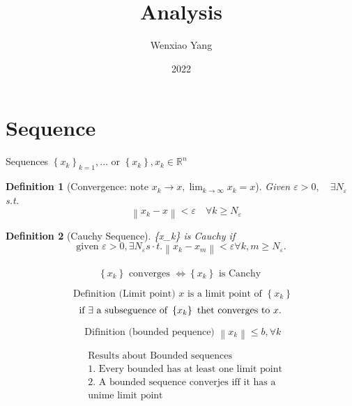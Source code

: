 \documentclass[11pt,a4paper]{article}
\title{Analysis}
\author[*]{Wenxiao Yang}
\affil[*]{Department of Mathematics, University of Illinois at Urbana-Champaign}
\date{2022}
\newtheorem{definition}{Definition}
\begin{document}
\maketitle
\tableofcontents
\newpage

\section{Sequence}
Sequences $\left\{x_{k}\right\}_{k=1}, \ldots$ or $\left\{x_{k}\right\}, x_{k} \in \mathbb{R}^{n}$
\begin{definition}[Convergence: note $x_{k} \rightarrow x, \lim _{k \rightarrow \infty} x_{k}=x$]
    Given $\varepsilon>0, \quad \exists N_{\varepsilon}$ s.t. $$\quad\left\|x_{k}-x\right\|<\varepsilon \quad \forall k \geqslant N_{\varepsilon}$$
\end{definition}

\begin{definition}[Cauchy Sequence]
    \{x_k\} is Cauchy if
    $$\text { given } \varepsilon>0, \exists N_{\varepsilon} s \cdot t .\left\|x_{k}-x_{m}\right\|<\varepsilon \forall k, m \geqslant N_{\varepsilon} \text {. }$$ \\
$$\left\{x_{k}\right\} \text { converges } \Longleftrightarrow\left\{x_{k}\right\} \text { is Canchy }$$
\end{definition}


$$
\text { Definition (Limit point) } x \text { is a limit point of }\left\{x_{k}\right\}
$$\[
\begin{array}{l}
$$\text { if } \exists \text { a subseguence of }\left\{x_{k}\right\} \text { thet converges to } x \text {. }$$
\end{array}
\]

$$
\text { Difinition (bounded pequence) }\left\|x_{k}\right\| \leqslant b, \forall k
$$

$$
\begin{aligned}
&\text { Results about Bounded sequences } \\
&\text { 1. Every bounded has at least one limit point } \\
&\text { 2. A bounded sequence converjes iff it has a } \\
&\text { unime limit point }
\end{aligned}
$$
\end{document}

